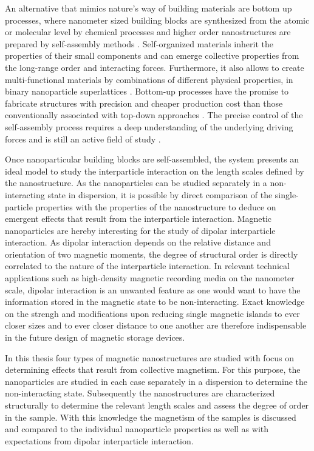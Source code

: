 \documentclass[\main/dresen_thesis.tex]{subfiles}
\begin{document}
  An alternative that mimics nature's way of building materials are bottom up processes, where nanometer sized building blocks are synthesized from the atomic or molecular level by chemical processes and higher order nanostructures are prepared by self-assembly methods \cite{Hannink_2006_Nanos, Whitesides_2002_Selfa}.
  Self-organized materials inherit the properties of their small components and can emerge collective properties from the long-range order and interacting forces.
  Furthermore, it also allows to create multi-functional materials by combinations of different physical properties, \eg in binary nanoparticle superlattices \cite{Redl_2003_Three}.
  Bottom-up processes have the promise to fabricate structures with precision and cheaper production cost than those conventionally associated with top-down approaches \cite{Hannink_2006_Nanos}.
  The precise control of the self-assembly process requires a deep understanding of the underlying driving forces and is still an active field of study \cite{Whitelam_2008_Thero, Powers_2016_Track, Josten_2017_Super}.

  Once nanoparticular building blocks are self-assembled, the system presents an ideal model to study the interparticle interaction on the length scales defined by the nanostructure.
  As the nanoparticles can be studied separately in a non-interacting state in dispersion, it is possible by direct comparison of the single-particle properties with the properties of the nanostructure to deduce on emergent effects that result from the interparticle interaction.
  Magnetic nanoparticles \cite{Lu_2007_Magne, Gubin_2005_Magne} are hereby interesting for the study of dipolar interparticle interaction.
  As dipolar interaction depends on the relative distance and orientation of two magnetic moments, the degree of structural order is directly correlated to the nature of the interparticle interaction.
  In relevant technical applications such as high-density magnetic recording media on the nanometer scale, dipolar interaction is an unwanted feature as one would want to have the information stored in the magnetic state to be non-interacting.
  Exact knowledge on the strengh and modifications upon reducing single magnetic islands to ever closer sizes and to ever closer distance to one another are therefore indispensable in the future design of magnetic storage devices.

    In this thesis four types of magnetic nanostructures are studied with focus on determining effects that result from collective magnetism.
    For this purpose, the nanoparticles are studied in each case separately in a dispersion to determine the non-interacting state.
    Subsequently the nanostructures are characterized structurally to determine the relevant length scales and assess the degree of order in the sample.
    With this knowledge the magnetism of the samples is discussed and compared to the individual nanoparticle properties as well as with expectations from dipolar interparticle interaction.
\end{document}
